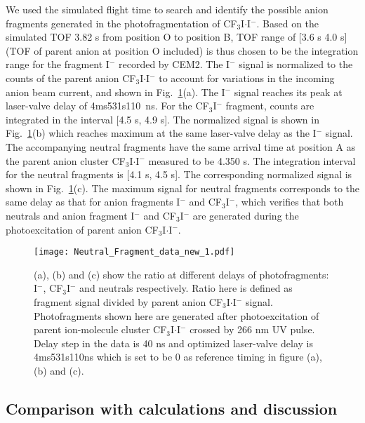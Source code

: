 \documentclass[%
aip,
rsi,
 amsmath,amssymb,
reprint,%
]{revtex4-1}
\begin{document}
We used the simulated flight time to search and identify the possible anion fragments generated in the photofragmentation of CF$_3$I$\cdot$I$^-$. Based on the simulated TOF 3.82 {\textmu}s from position O to position B, TOF range of [3.6 {\textmu}s 4.0 {\textmu}s] (TOF of parent anion at position O included) is thus chosen to be the integration range for the fragment I$^-$ recorded by CEM2. The I$^-$ signal is normalized to the counts of the parent anion CF$_3$I$\cdot$I$^-$ to account for variations in the incoming anion beam current, and shown in Fig.~\ref{data}(a). The I$^-$ signal reaches its peak at laser-valve delay of 4ms531{\textmu}s110~ns. For the CF$_3$I$^-$ fragment, counts are integrated in the interval [4.5 {\textmu}s, 4.9 {\textmu}s]. The normalized signal is shown in Fig.~\ref{data}(b) which reaches maximum at the same laser-valve delay as the I$^-$ signal. The accompanying neutral fragments have the same arrival time at position A as the parent anion cluster CF$_3$I$\cdot$I$^-$ measured to be 4.350 {\textmu}s. The integration interval for the neutral fragments is [4.1 {\textmu}s, 4.5 {\textmu}s]. The corresponding normalized signal is shown in Fig.~\ref{data}(c). The maximum signal for neutral fragments corresponds to the same delay as that for anion fragments I$^-$ and CF$_3$I$^-$, which verifies that both neutrals and anion fragment I$^-$ and CF$_3$I$^-$ are generated during the photoexcitation of parent anion CF$_3$I$\cdot$I$^-$. 

\begin{figure}[!htb]
\centering
\texttt{[image: Neutral\_Fragment\_data\_new\_1.pdf]}
\caption{(a), (b) and (c) show the ratio at different delays of photofragments: I$^-$, CF$_3$I$^-$ and neutrals respectively. Ratio here is defined as fragment signal divided by parent anion CF$_3$I$\cdot$I$^-$ signal. Photofragments shown here are generated after photoexcitation of parent ion-molecule cluster CF$_3$I$\cdot$I$^-$ crossed by 266 nm UV pulse. Delay step in the data is 40 ns and optimized laser-valve delay is 4ms531{\textmu}s110ns which is set to be 0 as reference timing in figure (a), (b) and (c).}
\label{data}
\end{figure}

\subsection{Comparison with calculations and discussion}
\end{document}
